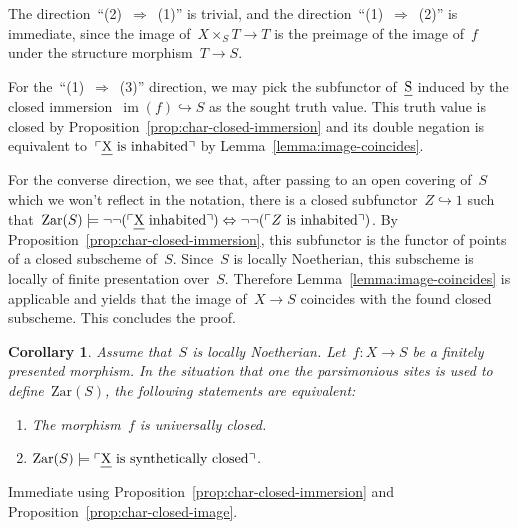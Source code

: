 \documentclass[10pt,reqno,a4paper]{amsbook}
\makeatletter
\theoremstyle{definition}
\theoremstyle{plain}
\newtheorem{cor}[defn]{Corollary}
\theoremstyle{remark}
\let\oldul\ul
\renewcommand{\ul}[1]{\text{\oldul{$#1$}}}
\newcommand{\Zar}{\mathrm{Zar}}
\DeclareMathOperator{\im}{im}
\newcommand{\?}{\,{:}\,}
\renewcommand{\_}{\mathpunct{.}\,}
\newcommand{\speak}[1]{\ulcorner\text{\textnormal{#1}}\urcorner}
\renewenvironment{proof}[1][\proofname]{\par
  \pushQED{\qed}%
  \normalfont \topsep6\p@\@plus6\p@\relax
  \trivlist
  \item[\hskip\labelsep
        \itshape
    #1\@addpunct{.}]\ignorespaces
}{%
  \popQED\endtrivlist\@endpefalse
}
\makeatother
\begin{document}
\begin{proof}The direction~``(2)~$\Rightarrow$~(1)'' is trivial, and the
direction~``(1)~$\Rightarrow$~(2)'' is immediate, since the image of~$X
\times_S T \to T$ is the preimage of the image of~$f$ under the structure
morphism~$T \to S$.

For the~``(1)~$\Rightarrow$~(3)'' direction, we may pick the subfunctor
of~$\ul{S}$ induced by the closed immersion~$\im(f) \hookrightarrow S$ as the
sought truth value. This truth value is closed by
Proposition~\ref{prop:char-closed-immersion} and its double negation is
equivalent to~$\speak{$\ul{X}$ is inhabited}$ by
Lemma~\ref{lemma:image-coincides}.

For the converse direction, we see that, after passing to an open covering
of~$S$ which we won't reflect in the notation, there is a closed subfunctor~$Z
\hookrightarrow 1$ such that~$\Zar(S) \models \neg\neg(\speak{$\ul{X}$
inhabited}) \Leftrightarrow \neg\neg(\speak{$Z$ is inhabited})$. By
Proposition~\ref{prop:char-closed-immersion}, this subfunctor is the functor of
points of a closed subscheme of~$S$. Since~$S$ is locally Noetherian, this
subscheme is locally of finite presentation over~$S$. Therefore
Lemma~\ref{lemma:image-coincides} is applicable and yields that the image of~$X
\to S$ coincides with the found closed subscheme. This concludes the proof.
\end{proof}


\begin{cor}\label{cor:univ-closed}
Assume that~$S$ is locally Noetherian. Let~$f : X \to S$ be a
finitely presented morphism. In the situation that one the parsimonious
sites is used to define~$\Zar(S)$, the following statements are equivalent:
\begin{enumerate}
\item The morphism~$f$ is universally closed.
\item $\Zar(S) \models \speak{$\ul{X}$ is synthetically closed}$.
\end{enumerate}
\end{cor}

\begin{proof}Immediate using Proposition~\ref{prop:char-closed-immersion} and
Proposition~\ref{prop:char-closed-image}.
\end{proof}
\end{document}
